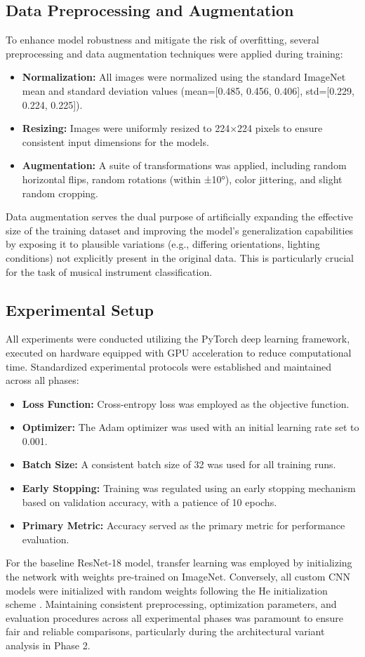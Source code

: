 \subsection{Data Preprocessing and Augmentation}
To enhance model robustness and mitigate the risk of overfitting, several preprocessing and data augmentation techniques were applied during training:
\begin{itemize}
    \item \textbf{Normalization:} All images were normalized using the standard ImageNet mean and standard deviation values (mean=[0.485, 0.456, 0.406], std=[0.229, 0.224, 0.225]).
    \item \textbf{Resizing:} Images were uniformly resized to 224×224 pixels to ensure consistent input dimensions for the models.
    \item \textbf{Augmentation:} A suite of transformations was applied, including random horizontal flips, random rotations (within ±10°), color jittering, and slight random cropping.
\end{itemize}

Data augmentation serves the dual purpose of artificially expanding the effective size of the training dataset and improving the model's generalization capabilities by exposing it to plausible variations (e.g., differing orientations, lighting conditions) not explicitly present in the original data. This is particularly crucial for the task of musical instrument classification.

\subsection{Experimental Setup}
All experiments were conducted utilizing the PyTorch deep learning framework, executed on hardware equipped with GPU acceleration to reduce computational time. Standardized experimental protocols were established and maintained across all phases:
\begin{itemize}
    \item \textbf{Loss Function:} Cross-entropy loss was employed as the objective function.
    \item \textbf{Optimizer:} The Adam optimizer was used with an initial learning rate set to 0.001.
    \item \textbf{Batch Size:} A consistent batch size of 32 was used for all training runs.
    \item \textbf{Early Stopping:} Training was regulated using an early stopping mechanism based on validation accuracy, with a patience of 10 epochs.
    \item \textbf{Primary Metric:} Accuracy served as the primary metric for performance evaluation.
\end{itemize}

For the baseline ResNet-18 model, transfer learning was employed by initializing the network with weights pre-trained on ImageNet. Conversely, all custom CNN models were initialized with random weights following the He initialization scheme \cite{he2015delving}. Maintaining consistent preprocessing, optimization parameters, and evaluation procedures across all experimental phases was paramount to ensure fair and reliable comparisons, particularly during the architectural variant analysis in Phase 2.
